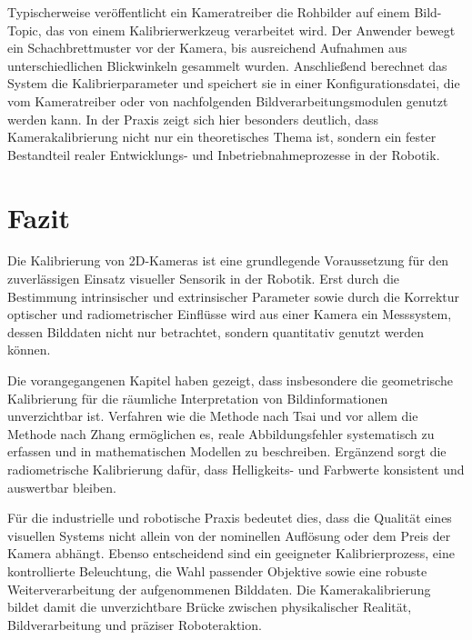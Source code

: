 \documentclass[12pt,a4paper,parskip=half]{scrartcl}
\begin{document}
Typischerweise veröffentlicht ein Kameratreiber die Rohbilder auf einem Bild-Topic, das von einem Kalibrierwerkzeug verarbeitet wird. Der Anwender bewegt ein Schachbrettmuster vor der Kamera, bis ausreichend Aufnahmen aus unterschiedlichen Blickwinkeln gesammelt wurden. Anschließend berechnet das System die Kalibrierparameter und speichert sie in einer Konfigurationsdatei, die vom Kameratreiber oder von nachfolgenden Bildverarbeitungsmodulen genutzt werden kann. In der Praxis zeigt sich hier besonders deutlich, dass Kamerakalibrierung nicht nur ein theoretisches Thema ist, sondern ein fester Bestandteil realer Entwicklungs- und Inbetriebnahmeprozesse in der Robotik.

\section{Fazit}
Die Kalibrierung von 2D-Kameras ist eine grundlegende Voraussetzung für den zuverlässigen Einsatz visueller Sensorik in der Robotik. Erst durch die Bestimmung intrinsischer und extrinsischer Parameter sowie durch die Korrektur optischer und radiometrischer Einflüsse wird aus einer Kamera ein Messsystem, dessen Bilddaten nicht nur betrachtet, sondern quantitativ genutzt werden können.

Die vorangegangenen Kapitel haben gezeigt, dass insbesondere die geometrische Kalibrierung für die räumliche Interpretation von Bildinformationen unverzichtbar ist. Verfahren wie die Methode nach Tsai und vor allem die Methode nach Zhang ermöglichen es, reale Abbildungsfehler systematisch zu erfassen und in mathematischen Modellen zu beschreiben. Ergänzend sorgt die radiometrische Kalibrierung dafür, dass Helligkeits- und Farbwerte konsistent und auswertbar bleiben.

Für die industrielle und robotische Praxis bedeutet dies, dass die Qualität eines visuellen Systems nicht allein von der nominellen Auflösung oder dem Preis der Kamera abhängt. Ebenso entscheidend sind ein geeigneter Kalibrierprozess, eine kontrollierte Beleuchtung, die Wahl passender Objektive sowie eine robuste Weiterverarbeitung der aufgenommenen Bilddaten. Die Kamerakalibrierung bildet damit die unverzichtbare Brücke zwischen physikalischer Realität, Bildverarbeitung und präziser Roboteraktion.
\end{document}

